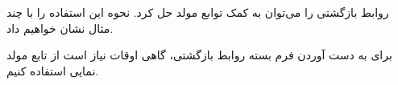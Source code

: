 \p
روابط بازگشتی را می‌توان به کمک توابع مولد حل کرد.
نحوه این استفاده را با چند مثال نشان خواهیم داد.




\p
برای به دست آوردن فرم بسته روابط بازگشتی، گاهی اوقات نیاز است از تابع مولد نمایی استفاده کنیم.

